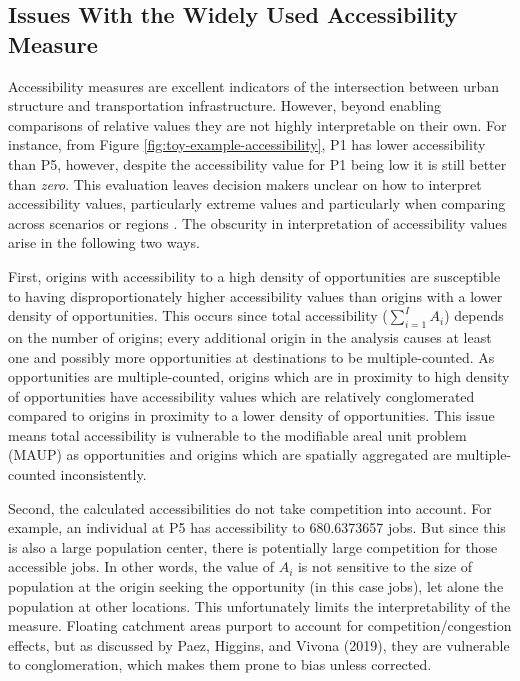 \documentclass[]{elsarticle} %
\begin{document}
\hypertarget{issues-with-the-widely-used-accessibility-measure}{%
\subsection{Issues With the Widely Used Accessibility
Measure}\label{issues-with-the-widely-used-accessibility-measure}}

Accessibility measures are excellent indicators of the intersection
between urban structure and transportation infrastructure. However,
beyond enabling comparisons of relative values they are not highly
interpretable on their own. For instance, from Figure
\ref{fig:toy-example-accessibility}, P1 has lower accessibility than P5,
however, despite the accessibility value for P1 being low it is still
better than \emph{zero}. This evaluation leaves decision makers unclear
on how to interpret accessibility values, particularly extreme values
and particularly when comparing across scenarios or regions . The
obscurity in interpretation of accessibility values arise in the
following two ways.

First, origins with accessibility to a high density of opportunities are
susceptible to having disproportionately higher accessibility values
than origins with a lower density of opportunities. This occurs since
total accessibility (\(\sum_{i=1}^IA_i\)) depends on the number of
origins; every additional origin in the analysis causes at least one and
possibly more opportunities at destinations to be multiple-counted. As
opportunities are multiple-counted, origins which are in proximity to
high density of opportunities have accessibility values which are
relatively conglomerated compared to origins in proximity to a lower
density of opportunities. This issue means total accessibility is
vulnerable to the modifiable areal unit problem (MAUP) as opportunities
and origins which are spatially aggregated are multiple-counted
inconsistently.

Second, the calculated accessibilities do not take competition into
account. For example, an individual at P5 has accessibility to
680.6373657 jobs. But since this is also a large population center,
there is potentially large competition for those accessible jobs. In
other words, the value of \(A_i\) is not sensitive to the size of
population at the origin seeking the opportunity (in this case jobs),
let alone the population at other locations. This unfortunately limits
the interpretability of the measure. Floating catchment areas purport to
account for competition/congestion effects, but as discussed by Paez,
Higgins, and Vivona (2019), they are vulnerable to conglomeration, which
makes them prone to bias unless corrected.
\end{document}

